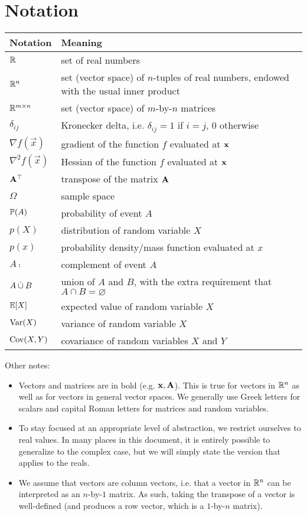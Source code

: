 \documentclass{article}
\begin{document}
\section{Notation}
\begin{tabular}{|l|l|}
\hline
Notation & Meaning \\
\hline
$\mathbb{R}$ & set of real numbers \\
$\mathbb{R}^n$ & set (vector space) of $n$-tuples of real numbers, endowed with the usual inner product \\
$\mathbb{R}^{m \times n}$ & set (vector space) of $m$-by-$n$ matrices \\
$\delta_{ij}$ & Kronecker delta, i.e. $\delta_{ij} = 1$ if $i = j$, $0$ otherwise \\
$\nabla f(\vec{x})$ & gradient of the function $f$ evaluated at $\mathbf{x}$ \\
$\nabla^2 f(\vec{x})$ & Hessian of the function $f$ evaluated at $\mathbf{x}$ \\
$\mathbf{A}^\top$ & transpose of the matrix $\mathbf{A}$ \\
$\Omega$ & sample space \\
$\mathbb{P}(A)$ & probability of event $A$ \\
$p(X)$ & distribution of random variable $X$ \\
$p(x)$ & probability density/mass function evaluated at $x$ \\
$A\comp$ & complement of event $A$ \\
$A \mathbin{\dot{\cup}} B$ & union of $A$ and $B$, with the extra requirement that $A \cap B = \varnothing$ \\
$\mathbb{E}[X]$ & expected value of random variable $X$ \\
$\operatorname{Var}(X)$ & variance of random variable $X$ \\
$\operatorname{Cov}(X, Y)$ & covariance of random variables $X$ and $Y$ \\
\hline
\end{tabular}

\vspace{0.5cm}
Other notes:
\begin{itemize}
\item Vectors and matrices are in bold (e.g. $\mathbf{x}, \mathbf{A}$).
This is true for vectors in $\mathbb{R}^n$ as well as for vectors in general vector spaces.
We generally use Greek letters for scalars and capital Roman letters for matrices and random variables.

\item To stay focused at an appropriate level of abstraction, we restrict ourselves to real values.
In many places in this document, it is entirely possible to generalize to the complex case, but we will simply state the version that applies to the reals.

\item We assume that vectors are column vectors, i.e. that a vector in $\mathbb{R}^n$ can be interpreted as an $n$-by-$1$ matrix.
As such, taking the transpose of a vector is well-defined (and produces a row vector, which is a $1$-by-$n$ matrix).
\end{itemize}
\end{document}

